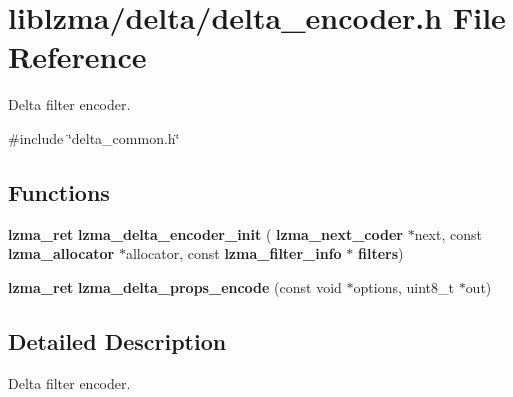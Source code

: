 \section{liblzma/delta/delta\+\_\+encoder.h File Reference}
\label{delta__encoder_8h}


Delta filter encoder.  


{\ttfamily \#include \char`\"{}delta\+\_\+common.\+h\char`\"{}}\newline
\subsection*{Functions}
\begin{DoxyCompactItemize}
\item 
\mbox{\label{delta__encoder_8h_af5ccd3ca86784025440893bc9867a208}} 
\textbf{ lzma\+\_\+ret} {\bfseries lzma\+\_\+delta\+\_\+encoder\+\_\+init} (\textbf{ lzma\+\_\+next\+\_\+coder} $\ast$next, const \textbf{ lzma\+\_\+allocator} $\ast$allocator, const \textbf{ lzma\+\_\+filter\+\_\+info} $\ast$\textbf{ filters})
\item 
\mbox{\label{delta__encoder_8h_aeac2126d3a2fc0ab4e32a0d3b0e0fc9e}} 
\textbf{ lzma\+\_\+ret} {\bfseries lzma\+\_\+delta\+\_\+props\+\_\+encode} (const void $\ast$options, uint8\+\_\+t $\ast$out)
\end{DoxyCompactItemize}


\subsection{Detailed Description}
Delta filter encoder. 

